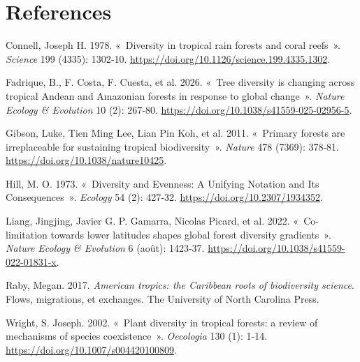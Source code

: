 \documentclass[
  french,
  11pt,
]{stylisharticle}
\newlength{\cslhangindent}
\newenvironment{CSLReferences}[2] %
 {\begin{list}{}{%
  \setlength{\itemindent}{0pt}
  \setlength{\leftmargin}{0pt}
  \setlength{\parsep}{0pt}
  \ifodd #1
   \setlength{\leftmargin}{\cslhangindent}
   \setlength{\itemindent}{-1\cslhangindent}
  \fi
  \setlength{\itemsep}{#2\baselineskip}}}
 {\end{list}}
\begin{document}
\section*{References}\label{bibliography}

\protect{}\label{refs}
\begin{CSLReferences}{1}{1}
Connell, Joseph H. 1978. {«~Diversity in tropical rain forests and coral
reefs~»}. \emph{Science} 199 (4335): 1302‑10.
\url{https://doi.org/10.1126/science.199.4335.1302}.

{Fadrique, B., F. Costa, F. Cuesta, et al.} 2026. {«~Tree diversity is
changing across tropical Andean and Amazonian forests in response to
global change~»}. \emph{Nature Ecology \& Evolution} 10 (2): 267‑80.
\url{https://doi.org/10.1038/s41559-025-02956-5}.

{Gibson, Luke, Tien Ming Lee, Lian Pin Koh, et al.} 2011. {«~Primary
forests are irreplaceable for sustaining tropical biodiversity~»}.
\emph{Nature} 478 (7369): 378‑81.
\url{https://doi.org/10.1038/nature10425}.

Hill, M. O. 1973. {«~Diversity and Evenness: A Unifying Notation and Its
Consequences~»}. \emph{Ecology} 54 (2): 427‑32.
\url{https://doi.org/10.2307/1934352}.

{Liang, Jingjing, Javier G. P. Gamarra, Nicolas Picard, et al.} 2022.
{«~Co-limitation towards lower latitudes shapes global forest diversity
gradients~»}. \emph{Nature Ecology \& Evolution} 6 (août): 1423‑37.
\url{https://doi.org/10.1038/s41559-022-01831-x}.

Raby, Megan. 2017. \emph{American tropics: the Caribbean roots of
biodiversity science}. Flows, migrations, et exchanges. The University
of North Carolina Press.

Wright, S. Joseph. 2002. {«~Plant diversity in tropical forests: a
review of mechanisms of species coexistence~»}. \emph{Oecologia} 130
(1): 1‑14. \url{https://doi.org/10.1007/s004420100809}.

\end{CSLReferences}
\end{document}
